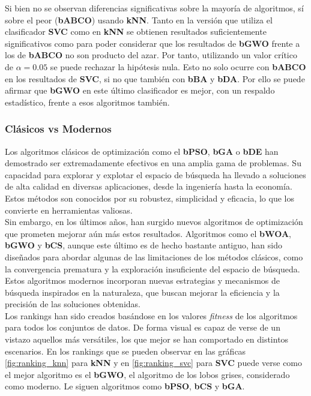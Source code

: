 Si bien no se observan diferencias significativas sobre la mayoría de algoritmos, sí sobre el peor (\textbf{bABCO}) usando \textbf{kNN}. Tanto en la versión que utiliza el clasificador \textbf{SVC} como en \textbf{kNN} se obtienen resultados suficientemente significativos como para poder considerar que los resultados de \textbf{bGWO} frente a los de \textbf{bABCO} no son producto del azar. Por tanto, utilizando un valor crítico de $\alpha=0.05$ se puede rechazar la hipótesis nula. Esto no solo ocurre con \textbf{bABCO} en los resultados de \textbf{SVC}, si no que también con \textbf{bBA} y \textbf{bDA}. Por ello se puede afirmar que \textbf{bGWO} en este último clasificador es mejor, con un respaldo estadístico, frente a esos algoritmos también.

\subsubsection{Clásicos vs Modernos}
Los algoritmos clásicos de optimización como el \textbf{bPSO}, \textbf{bGA} o \textbf{bDE} han demostrado ser extremadamente efectivos en una amplia gama de problemas. Su capacidad para explorar y explotar el espacio de búsqueda ha llevado a soluciones de alta calidad en diversas aplicaciones, desde la ingeniería hasta la economía. Estos métodos son conocidos por su robustez, simplicidad y eficacia, lo que los convierte en herramientas valiosas.\\[6pt]
Sin embargo, en los últimos años, han surgido nuevos algoritmos de optimización que prometen mejorar aún más estos resultados. Algoritmos como el \textbf{bWOA}, \textbf{bGWO} y \textbf{bCS}, aunque este último es de hecho bastante antiguo, han sido diseñados para abordar algunas de las limitaciones de los métodos clásicos, como la convergencia prematura y la exploración insuficiente del espacio de búsqueda. Estos algoritmos modernos incorporan nuevas estrategias y mecanismos de búsqueda inspirados en la naturaleza, que buscan mejorar la eficiencia y la precisión de las soluciones obtenidas.\\[6pt]

Los rankings han sido creados basándose en los valores \textit{fitness} de los algoritmos para todos los conjuntos de datos. De forma visual es capaz de verse de un vistazo aquellos más versátiles, los que mejor se han comportado en distintos escenarios. En los rankings que se pueden observar en las gráficas \ref{fig:ranking_knn} para \textbf{kNN} y en \ref{fig:ranking_svc} para \textbf{SVC} puede verse como el mejor algoritmo es el \textbf{bGWO}, el algoritmo de los lobos grises, considerado como moderno. Le siguen algoritmos como \textbf{bPSO}, \textbf{bCS} y \textbf{bGA}.\\[6pt]

